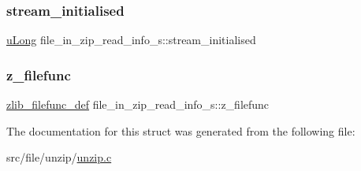 \subsubsection{\texorpdfstring{stream\+\_\+initialised}{stream\_initialised}}
{\footnotesize\ttfamily \hyperlink{ioapi_8h_a50e9e9d5c30e481de822ad68fe537986}{u\+Long} file\+\_\+in\+\_\+zip\+\_\+read\+\_\+info\+\_\+s\+::stream\+\_\+initialised}

\mbox{\label{structfile__in__zip__read__info__s_a5eae7e8fffe8d7e9e7271ce2206283e7}} 
\subsubsection{\texorpdfstring{z\+\_\+filefunc}{z\_filefunc}}
{\footnotesize\ttfamily \hyperlink{ioapi_8h_a269f2bded66a7ee4052a60025afebd7e}{zlib\+\_\+filefunc\+\_\+def} file\+\_\+in\+\_\+zip\+\_\+read\+\_\+info\+\_\+s\+::z\+\_\+filefunc}



The documentation for this struct was generated from the following file\+:\begin{DoxyCompactItemize}
\item 
src/file/unzip/\hyperlink{unzip_8c}{unzip.\+c}\end{DoxyCompactItemize}
